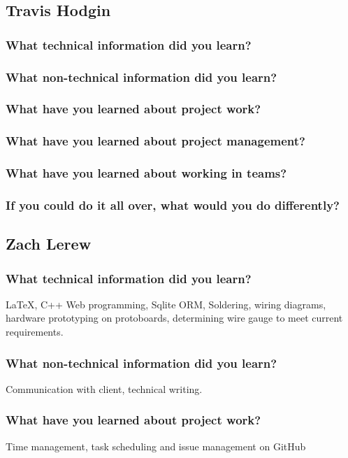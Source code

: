 \documentclass[onecolumn, draftclsnofoot,10pt, compsoc]{IEEEtran}
\begin{document}
		\subsection{Travis Hodgin}
			\subsubsection{What technical information did you learn?}
			\subsubsection{What non-technical information did you learn?}
			\subsubsection{What have you learned about project work?}
			\subsubsection{What have you learned about project management?}
			\subsubsection{What have you learned about working in teams?}
			\subsubsection{If you could do it all over, what would you do differently?}
		\subsection{Zach Lerew}
			\subsubsection{What technical information did you learn?}
			LaTeX, C++ Web programming, Sqlite ORM, Soldering, wiring diagrams, hardware prototyping on protoboards, determining wire gauge to meet current requirements.
 			\subsubsection{What non-technical information did you learn?}
			Communication with client, technical writing.
 			\subsubsection{What have you learned about project work?}
			Time management, task scheduling and issue management on GitHub
\end{document}

